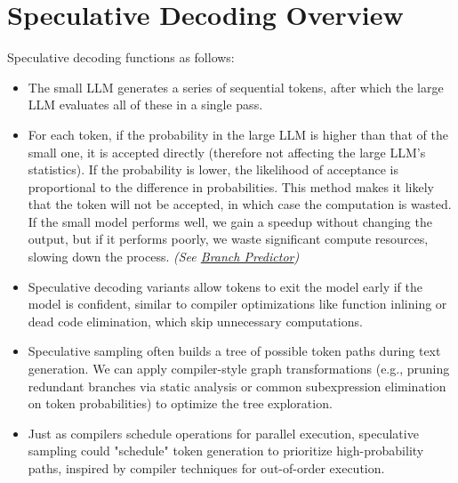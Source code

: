 \documentclass[a4paper,12pt]{report}
\begin{document}
\section{Speculative Decoding Overview}
Speculative decoding functions as follows:
\begin{itemize}
\item The small LLM generates a series of sequential tokens, after which the large LLM evaluates all of these in a single pass.
\item For each token, if the probability in the large LLM is higher than that of the small one, it is accepted directly (therefore not affecting the large LLM's statistics). If the probability is lower, the likelihood of acceptance is proportional to the difference in probabilities. This method makes it likely that the token will not be accepted, in which case the computation is wasted. If the small model performs well, we gain a speedup without changing the output, but if it performs poorly, we waste significant compute resources, slowing down the process. \emph{(See \href{https://en.wikipedia.org/wiki/Branch_predictor}{Branch Predictor})}
\item Speculative decoding variants allow tokens to exit the model early if the model is confident, similar to compiler optimizations like function inlining or dead code elimination, which skip unnecessary computations.
\item Speculative sampling often builds a tree of possible token paths during text generation. We can apply compiler-style graph transformations (e.g., pruning redundant branches via static analysis or common subexpression elimination on token probabilities) to optimize the tree exploration.
\item Just as compilers schedule operations for parallel execution, speculative sampling could "schedule" token generation to prioritize high-probability paths, inspired by compiler techniques for out-of-order execution.
\end{itemize}
\end{document}
